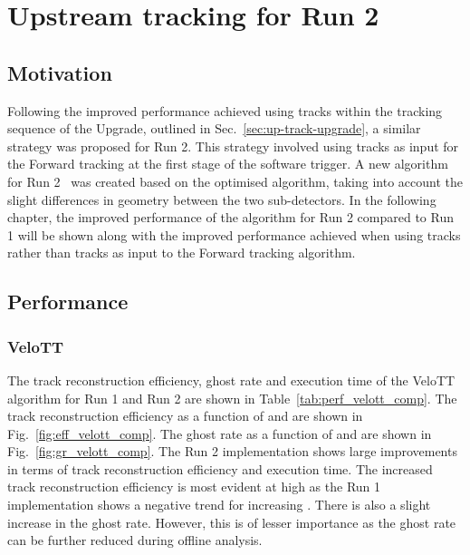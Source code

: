 \section{Upstream tracking for \lhcb Run 2}
\label{sec:up-track-run2}

\subsection{Motivation}

Following the improved performance achieved using \velout tracks within the tracking sequence of the \lhcb Upgrade, outlined in Sec.~\ref{sec:up-track-upgrade}, a similar strategy was proposed for \lhcb Run 2. This strategy involved using \velott tracks as input for the Forward tracking at the first stage of the software trigger. A new \velott algorithm for Run 2~\cite{velott} was created based on the optimised \velout algorithm, taking into account the slight differences in geometry between the two sub-detectors. In the following chapter, the improved performance of the \velott algorithm for Run 2 compared to Run 1 will be shown along with the improved performance achieved when using \velott tracks rather than \velo tracks as input to the Forward tracking algorithm.

\subsection{Performance}

\subsubsection{VeloTT}

The track reconstruction efficiency, ghost rate and execution time of the VeloTT algorithm for Run 1 and Run 2 are shown in Table~\ref{tab:perf_velott_comp}. The track reconstruction efficiency as a function of \ptot and \pt are shown in Fig.~\ref{fig:eff_velott_comp}. The ghost rate as a function of \ptot and \pt are shown in Fig.~\ref{fig:gr_velott_comp}. The Run 2 implementation shows large improvements in terms of track reconstruction efficiency and execution time. The increased track reconstruction efficiency is most evident at high \ptot as the Run 1 implementation shows a negative trend for increasing \ptot. There is also a slight increase in the ghost rate. However, this is of lesser importance as the ghost rate can be further reduced during offline analysis. 

